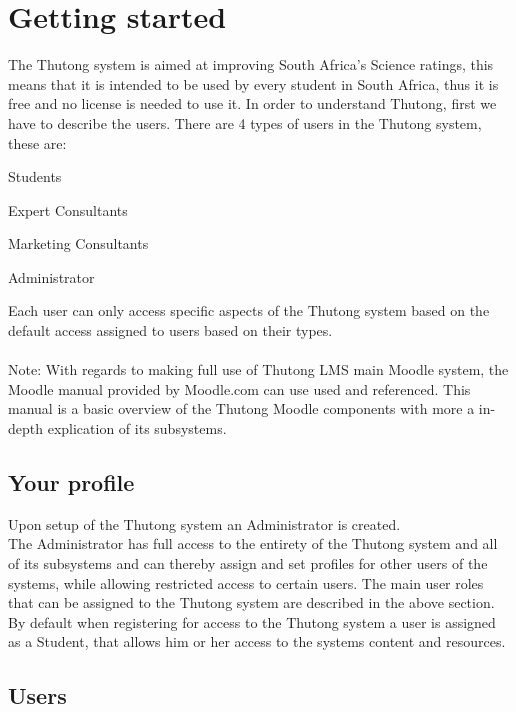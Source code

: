 \documentclass[english]{article}
\begin{document}
	\section{Getting started}
The Thutong system is aimed at improving South Africa’s Science ratings, this means that it is intended to be used by every student in South Africa, thus it is free and no license is needed to use it. In order to understand Thutong, first we have to describe the users.
There are 4 types of users in the Thutong system, these are: 
\begin{list}{•}{•}
\item Students
\item Expert Consultants
\item Marketing Consultants
\item Administrator
\end{list}
Each user can only access specific aspects of the Thutong system based on the default access assigned to users based on their types. \\\\
Note: With regards to making full use of Thutong LMS main Moodle system, the Moodle manual provided by Moodle.com can use used and referenced. This manual is a basic overview of the Thutong Moodle components with more a in-depth explication of its subsystems. 


	
	
\subsection{Your profile}
	
Upon setup of the Thutong system an Administrator is created. \\
The Administrator has full access to the entirety of the Thutong system and all of its subsystems and can thereby assign and set profiles for other users of the systems, while allowing restricted access to certain users. The main user roles that can be assigned to the Thutong system are described in the above section.\\
By default when registering for access to the Thutong system a user is assigned as a Student, that allows him or her access to the systems content and resources.
		
		
		
				
\subsection{Users}
\end{document}
